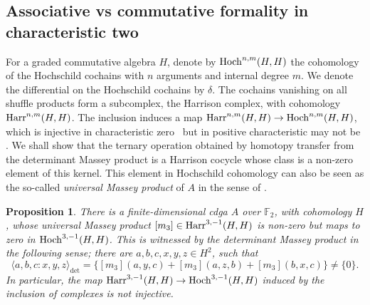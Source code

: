 \documentclass[11pt]{article}
\newtheorem{proposition}[theorem]{Proposition}
\theoremstyle{definition}
\theoremstyle{definition}
\begin{document}
\subsection{Associative vs commutative formality in characteristic two}
\label{sec: ass vs com in char 2}

For a graded commutative algebra $H$, denote by $\operatorname{Hoch}^{n,m}(H,H)$ 
the cohomology of the Hochschild cochains with $n$ arguments and internal degree $m$. 
We denote the differential on the Hochschild cochains by $\delta.$
The cochains vanishing on all shuffle products form a subcomplex, the Harrison complex, with cohomology $\operatorname{Harr}^{n,m}(H,H)$. 
The inclusion induces a map $\operatorname{Harr}^{n,m}(H,H) \to \operatorname{Hoch}^{n,m}(H,H)$, which is injective in characteristic zero~\cite{Barr68, Gerst87, ginot10} but in positive characteristic may not be \cite[Section 4]{Barr68}.
We shall show that the ternary operation obtained by homotopy transfer from the determinant Massey product is a Harrison cocycle whose class is a non-zero element of this kernel. 
This element in Hochschild cohomology can also be seen as the so-called \emph{universal Massey product} of $A$ in the sense of \cite{BKS04}.



\begin{proposition}
\label{prop: Harrison not injective}
There is a finite-dimensional cdga $A$ over $\mathbb F_2$, with cohomology $H$, whose universal Massey product
$[m_3] \in \operatorname{Harr}^{3,-1}(H,H)$ is non-zero but maps to zero in $\operatorname{Hoch}^{3,-1}(H,H)$.
This is witnessed by the determinant Massey product in the following sense; there are $a,b,c,x,y,z\in H^2$, such that
\begin{equation*}
\langle a,b,c : x,y,z\rangle_{\det}
=\bigl\{[m_3](a,y,c)+[m_3](a,z,b)+[m_3](b,x,c)\bigr\}\neq\{0\}.
\end{equation*}
In particular, the map
$\operatorname{Harr}^{3,-1}(H,H) \to \operatorname{Hoch}^{3,-1}(H,H)$
induced by the inclusion of complexes is not injective.
\end{proposition}
\end{document}
